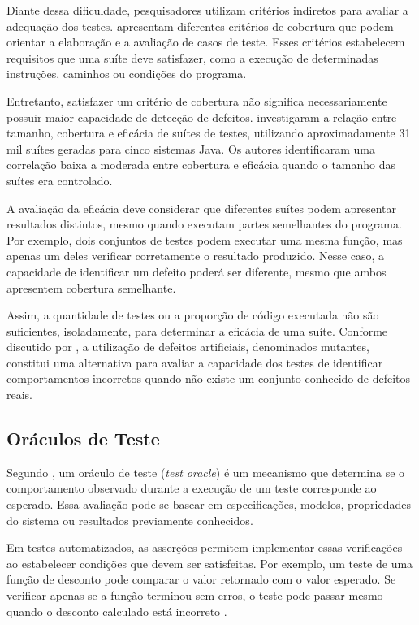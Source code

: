 Diante dessa dificuldade, pesquisadores utilizam critérios indiretos para avaliar a adequação dos testes.  apresentam diferentes critérios de cobertura que podem orientar a elaboração e a avaliação de casos de teste. Esses critérios estabelecem requisitos que uma suíte deve satisfazer, como a execução de determinadas instruções, caminhos ou condições do programa.

Entretanto, satisfazer um critério de cobertura não significa necessariamente possuir maior capacidade de detecção de defeitos.  investigaram a relação entre tamanho, cobertura e eficácia de suítes de testes, utilizando aproximadamente 31 mil suítes geradas para cinco sistemas Java. Os autores identificaram uma correlação baixa a moderada entre cobertura e eficácia quando o tamanho das suítes era controlado.

A avaliação da eficácia deve considerar que diferentes suítes podem apresentar resultados distintos, mesmo quando executam partes semelhantes do programa. Por exemplo, dois conjuntos de testes podem executar uma mesma função, mas apenas um deles verificar corretamente o resultado produzido. Nesse caso, a capacidade de identificar um defeito poderá ser diferente, mesmo que ambos apresentem cobertura semelhante.

Assim, a quantidade de testes ou a proporção de código executada não são suficientes, isoladamente, para determinar a eficácia de uma suíte. Conforme discutido por , a utilização de defeitos artificiais, denominados mutantes, constitui uma alternativa para avaliar a capacidade dos testes de identificar comportamentos incorretos quando não existe um conjunto conhecido de defeitos reais.

\subsection{Oráculos de Teste}

Segundo , um oráculo de teste (\textit{test oracle}) é um mecanismo que determina se o comportamento observado durante a execução de um teste corresponde ao esperado. Essa avaliação pode se basear em especificações, modelos, propriedades do sistema ou resultados previamente conhecidos.

Em testes automatizados, as asserções permitem implementar essas verificações ao estabelecer condições que devem ser satisfeitas. Por exemplo, um teste de uma função de desconto pode comparar o valor retornado com o valor esperado. Se verificar apenas se a função terminou sem erros, o teste pode passar mesmo quando o desconto calculado está incorreto \cite{ammann2016,barr2015}.


